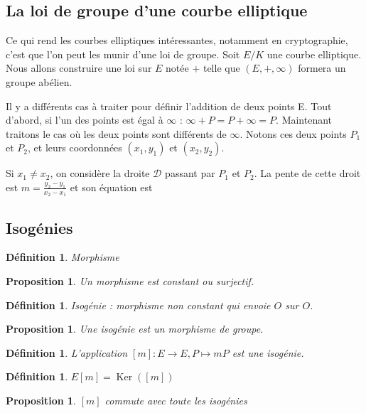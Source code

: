 \documentclass{article}
\theoremstyle{plain}%
\newtheorem{prop}[thm]{Proposition}
\newtheorem{deff}[thm]{Définition}
\theoremstyle{definition}%
\DeclareMathOperator{\Ker}{Ker}
\begin{document}
\subsection{La loi de groupe d'une courbe elliptique}

Ce qui rend les courbes elliptiques intéressantes, notamment en cryptographie, c'est que l'on peut les munir d'une loi de groupe. Soit $E/K$ une courbe elliptique. Nous allons construire une loi sur $E$ notée $+$ telle que $(E, +, \infty)$ formera un groupe abélien.

Il y a différents cas à traiter pour définir l'addition de deux points E.
Tout d'abord, si l'un des points est égal à $\infty$ : $\infty+P = P+\infty = P$.
Maintenant traitons le cas où les deux points sont différents de $\infty$. Notons ces deux points $P_1$ et $P_2$, et leurs coordonnées $(x_1, y_1)$ et $(x_2, y_2)$.

Si $x_1\neq x_2$, on considère la droite $\mathcal D$ passant par $P_1$ et $P_2$. La pente de cette droit est $m = \frac{y_2-y_1}{x_2-x_1}$ et son équation est

\subsection{Isogénies}
\begin{deff}
  Morphisme 
\end{deff}

\begin{prop}
  Un morphisme est constant ou surjectif.
\end{prop}

\begin{deff}
  Isogénie : morphisme non constant qui envoie $O$ sur $O$.
\end{deff}

\begin{prop}
  Une isogénie est un morphisme de groupe.
\end{prop}

\begin{deff}
  L'application $[m] : E \to E, P \mapsto mP$ est une isogénie. 
\end{deff}

\begin{deff}
  $E[m] = \Ker([m])$
\end{deff}

\begin{prop}
  $[m]$ commute avec toute les isogénies
\end{prop}
\end{document}
